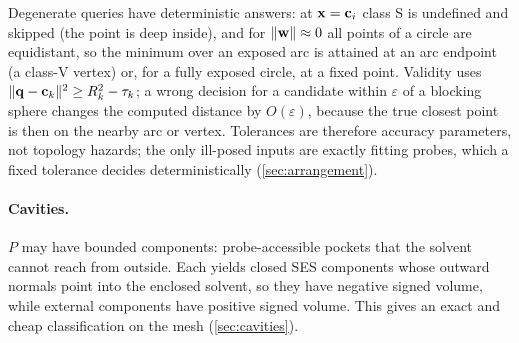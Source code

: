 Degenerate queries have deterministic answers: at $\mathbf{x} = \mathbf{c}_i$
class S is undefined and skipped (the point is deep inside), and for
$\lVert\mathbf{w}\rVert \approx 0$ all points of a circle are equidistant, so the
minimum over an exposed arc is attained at an arc endpoint (a class-V
vertex) or, for a fully exposed circle, at a fixed point. Validity uses
$\lVert\mathbf{q} - \mathbf{c}_k\rVert^2 \ge R_k^2 - \tau_k$; a wrong decision for a
candidate within $\varepsilon$ of a blocking sphere changes the computed
distance by $O(\varepsilon)$, because the true closest point is then on the
nearby arc or vertex. Tolerances are therefore accuracy parameters, not
topology hazards; the only ill-posed inputs are exactly fitting probes,
which a fixed tolerance decides deterministically (\cref{sec:arrangement}).

\paragraph{Cavities.}
$P$ may have bounded components: probe-accessible pockets that the solvent
cannot reach from outside. Each yields closed SES components whose outward
normals point into the enclosed solvent, so they have negative signed
volume, while external components have positive signed volume. This gives
an exact and cheap classification on the mesh (\cref{sec:cavities}).
